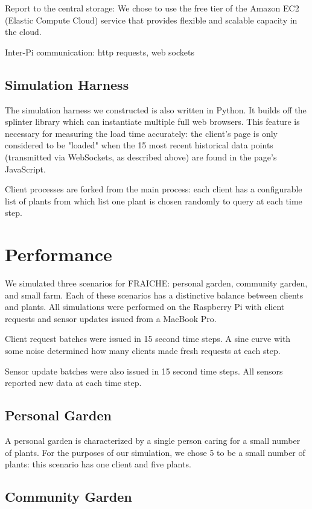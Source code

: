\documentclass[a4paper]{acm_proc_article-sp}
\begin{document}
Report to the central storage: We chose to use the free tier of the Amazon EC2 (Elastic Compute Cloud) service that provides flexible and scalable capacity in the cloud. 

Inter-Pi communication: http requests, web sockets

\subsection{Simulation Harness}

The simulation harness we constructed is also written in Python.  It builds off the splinter \cite{} library which can instantiate multiple full web browsers.  This feature is necessary for measuring the load time accurately: the client's page is only considered to be "loaded" when the 15 most recent historical data points (transmitted via WebSockets, as described above) are found in the page's JavaScript.

Client processes are forked from the main process: each client has a configurable list of plants from which list one plant is chosen randomly to query at each time step.  

\section{Performance}

We simulated three scenarios for FRAICHE: personal garden, community garden, and small farm.  Each of these scenarios has a distinctive balance between clients and plants.  All simulations were performed on the Raspberry Pi with client requests and sensor updates issued from a MacBook Pro.

Client request batches were issued in 15 second time steps.  A sine curve with some noise determined how many clients made fresh requests at each step.

Sensor update batches were also issued in 15 second time steps.  All sensors reported new data at each time step.

\subsection{Personal Garden}

A personal garden is characterized by a single person caring for a small number of plants.  For the purposes of our simulation, we chose 5 to be a small number of plants: this scenario has one client and five plants.

\subsection{Community Garden}
\end{document}
